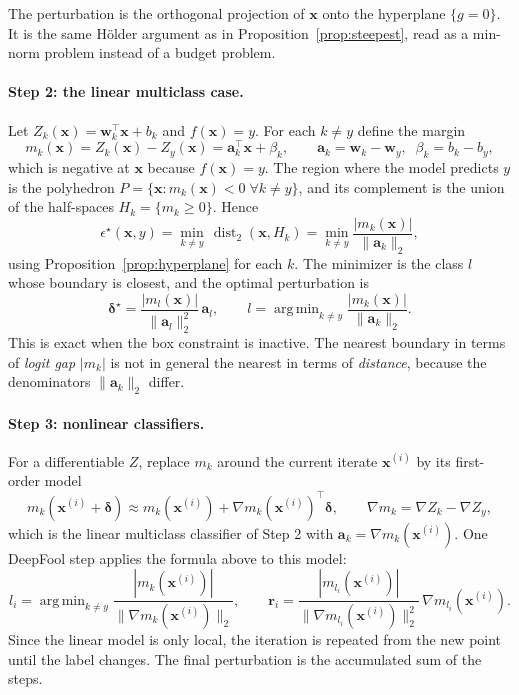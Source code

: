 \documentclass[10pt,a4paper]{extarticle}
\theoremstyle{definition}
\newcommand{\x}{\mathbf{x}}
\newcommand{\bdelta}{\boldsymbol{\delta}}
\DeclareMathOperator*{\argmin}{arg\,min}
\begin{document}
The perturbation is the orthogonal projection of \(\x\) onto the hyperplane \(\{g=0\}\). It is the same Hölder argument as in Proposition~\ref{prop:steepest}, read as a min-norm problem instead of a budget problem.

\paragraph{Step 2: the linear multiclass case.} Let \(Z_k(\x)=\mathbf{w}_k^\top\x+b_k\) and \(f(\x)=y\). For each \(k\neq y\) define the margin
\[
m_k(\x)=Z_k(\x)-Z_y(\x)=\mathbf{a}_k^\top\x+\beta_k,\qquad \mathbf{a}_k=\mathbf{w}_k-\mathbf{w}_y,\;\; \beta_k=b_k-b_y,
\]
which is negative at \(\x\) because \(f(\x)=y\). The region where the model predicts \(y\) is the polyhedron \(P=\{\x: m_k(\x)<0\;\forall k\neq y\}\), and its complement is the union of the half-spaces \(H_k=\{m_k\ge0\}\). Hence
\begin{equation}\label{eq:dfnearest}
\epsilon^\star(\x,y)=\min_{k\neq y}\,\operatorname{dist}_2(\x,H_k)=\min_{k\neq y}\frac{|m_k(\x)|}{\|\mathbf{a}_k\|_2},
\end{equation}
using Proposition~\ref{prop:hyperplane} for each \(k\). The minimizer is the class \(l\) whose boundary is closest, and the optimal perturbation is
\[
\bdelta^\star=\frac{|m_l(\x)|}{\|\mathbf{a}_l\|_2^2}\,\mathbf{a}_l,\qquad l=\argmin_{k\neq y}\frac{|m_k(\x)|}{\|\mathbf{a}_k\|_2}.
\]
This is exact when the box constraint is inactive. The nearest boundary in terms of \emph{logit gap} \(|m_k|\) is not in general the nearest in terms of \emph{distance}, because the denominators \(\|\mathbf{a}_k\|_2\) differ.

\paragraph{Step 3: nonlinear classifiers.} For a differentiable \(Z\), replace \(m_k\) around the current iterate \(\x^{(i)}\) by its first-order model
\[
m_k(\x^{(i)}+\bdelta)\approx m_k(\x^{(i)})+\nabla m_k(\x^{(i)})^\top\bdelta,\qquad \nabla m_k=\nabla Z_k-\nabla Z_y,
\]
which is the linear multiclass classifier of Step 2 with \(\mathbf{a}_k=\nabla m_k(\x^{(i)})\). One DeepFool step applies the formula above to this model:
\begin{equation}\label{eq:dfstep}
l_i=\argmin_{k\neq y}\frac{|m_k(\x^{(i)})|}{\|\nabla m_k(\x^{(i)})\|_2},\qquad
\mathbf{r}_i=\frac{|m_{l_i}(\x^{(i)})|}{\|\nabla m_{l_i}(\x^{(i)})\|_2^2}\,\nabla m_{l_i}(\x^{(i)}).
\end{equation}
Since the linear model is only local, the iteration is repeated from the new point until the label changes. The final perturbation is the accumulated sum of the steps.
\end{document}
